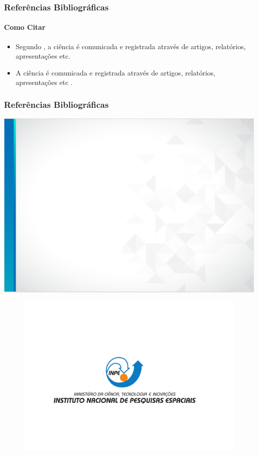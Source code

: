 \documentclass[10pt,aspectratio=169]{beamer}
\begin{document}
\begin{frame}
\frametitle{Referências Bibliográficas}
\framesubtitle{Como Citar}
\begin{itemize}
	\item Segundo , a ciência é comunicada e registrada através de artigos, relatórios, apresentações etc. 
	\item A ciência é comunicada e registrada através de artigos, relatórios, apresentações etc \cite{ciclanoetal/1975,fulano/1964}.
\end{itemize}
\end{frame}

\begin{frame}
\frametitle{Referências Bibliográficas}

\end{frame}

\usebackgroundtemplate%
{%
  \includegraphics[width=\paperwidth,height=\paperheight]{./img/fundo_slide_inpe_sem_logo.png}%
}

\begingroup
{}
{\nologo
\begin{frame}
  \begin{figure}[H]
    \vspace{-4em}
		\centering
    \hspace*{1.5em}\includegraphics[width=1.\textwidth]{./img/DesinacaoNominativaCentralizada2020.pdf}
  \end{figure}
\end{frame}
}
\endgroup
\end{document}
